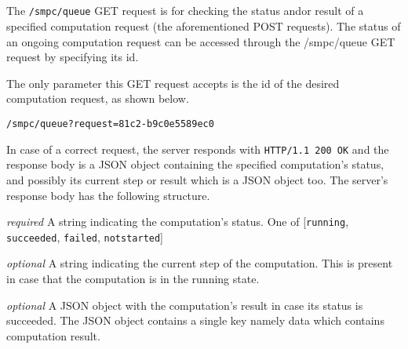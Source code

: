 \subsection[/smpc/queue GET request]{\protect{}}\label{s:get1}
The \texttt{/smpc/queue} GET request is for checking the status and\myslash or result of a specified computation request (the aforementioned POST requests).
The status of an ongoing computation request can be accessed through the /smpc/queue GET request by specifying its id.
\begin{description}[labelwidth=5em, leftmargin=\dimexpr\labelwidth+\labelsep\relax]
  \item[Request:] The only parameter this GET request accepts is the id of the desired computation request, as shown below.

\begin{minipage}{\linewidth}
{
\begin{verbatim}
/smpc/queue?request=81c2-b9c0e5589ec0
\end{verbatim}
\label{sc:queue-request}
}
\end{minipage}
  \item[Response:] In case of a correct request, the server responds with \texttt{HTTP/1.1 200 OK} and the response body is a JSON object containing the specified computation's status, and possibly its current step or result which is a JSON object too.
The server's response body has the following structure.
\begin{description}[labelwidth=4em, leftmargin=\dimexpr\labelwidth+\labelsep\relax]
    \item [\texttt{status}:]{\color{red}\textit{required}} A string indicating the computation's status. One of [\texttt{running}, \texttt{succeeded}, \texttt{failed}, \texttt{notstarted}]
    \item [\texttt{step}:]{\color{blue}\textit{optional}} A string indicating the current step of the computation. This is present in case that the computation is in the running state.
    \item [\texttt{result}:]{\color{blue}\textit{optional}} A JSON object with the computation's result in case its status is succeeded. The JSON object contains a single key namely data which contains computation result.


\end{description}
\end{description}
